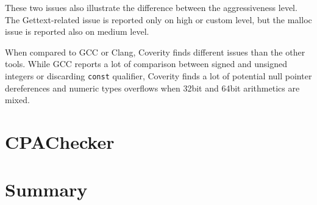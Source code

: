 These two issues also illustrate the difference between the aggressiveness
level. The Gettext-related issue is reported only on high or custom level, but
the malloc issue is reported also on medium level.

When compared to GCC or Clang, Coverity finds different issues than the other
tools. While GCC reports a lot of comparison between signed and unsigned
integers or discarding {\tt const} qualifier, Coverity finds a lot of potential
null pointer dereferences and numeric types overflows when 32bit and 64bit
arithmetics are mixed.

\section{CPAChecker}\label{chap:results:cpachecker}

\section{Summary}\label{chap:results:summary}

